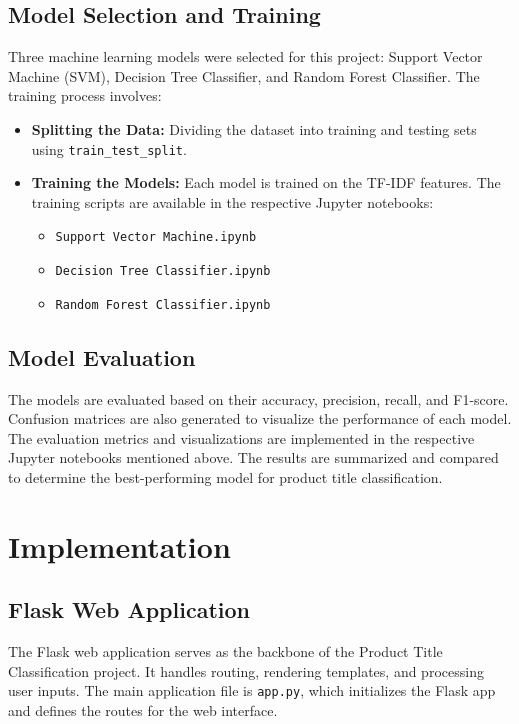 \documentclass[10pt]{article}
\begin{document}
\subsection{Model Selection and Training}
Three machine learning models were selected for this project: Support Vector Machine (SVM), Decision Tree Classifier, and Random Forest Classifier. The training process involves:
\begin{itemize}
    \item \textbf{Splitting the Data:} Dividing the dataset into training and testing sets using \texttt{train\_test\_split}.
    \item \textbf{Training the Models:} Each model is trained on the TF-IDF features. The training scripts are available in the respective Jupyter notebooks:
    \begin{itemize}
        \item \texttt{Support Vector Machine.ipynb}
        \item \texttt{Decision Tree Classifier.ipynb}
        \item \texttt{Random Forest Classifier.ipynb}
    \end{itemize}
\end{itemize}

\subsection{Model Evaluation}
The models are evaluated based on their accuracy, precision, recall, and F1-score. Confusion matrices are also generated to visualize the performance of each model. The evaluation metrics and visualizations are implemented in the respective Jupyter notebooks mentioned above. The results are summarized and compared to determine the best-performing model for product title classification.

\section{Implementation}

\subsection{Flask Web Application}
The Flask web application serves as the backbone of the Product Title Classification project. It handles routing, rendering templates, and processing user inputs. The main application file is \texttt{app.py}, which initializes the Flask app and defines the routes for the web interface.
\end{document}

